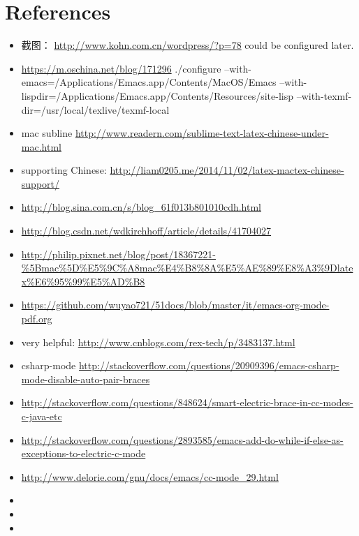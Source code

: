 \documentclass[9pt,b5paper]{article}
\begin{document}
\section{References}
\label{sec-3}
\begin{itemize}
\item 截图： \url{http://www.kohn.com.cn/wordpress/?p=78} could be configured later.
\item \url{https://m.oschina.net/blog/171296} ./configure --with-emacs=/Applications/Emacs.app/Contents/MacOS/Emacs --with-lispdir=/Applications/Emacs.app/Contents/Resources/site-lisp --with-texmf-dir=/usr/local/texlive/texmf-local
\item mac subline \url{http://www.readern.com/sublime-text-latex-chinese-under-mac.html}
\item supporting Chinese: \url{http://liam0205.me/2014/11/02/latex-mactex-chinese-support/}
\item \url{http://blog.sina.com.cn/s/blog_61f013b801010cdh.html}
\item \url{http://blog.csdn.net/wdkirchhoff/article/details/41704027}
\item \url{http://philip.pixnet.net/blog/post/18367221-\%5Bmac\%5D\%E5\%9C\%A8mac\%E4\%B8\%8A\%E5\%AE\%89\%E8\%A3\%9Dlatex\%E6\%95\%99\%E5\%AD\%B8}
\item \url{https://github.com/wuyao721/51docs/blob/master/it/emacs-org-mode-pdf.org}
\item very helpful: \url{http://www.cnblogs.com/rex-tech/p/3483137.html}
\item csharp-mode \url{http://stackoverflow.com/questions/20909396/emacs-csharp-mode-disable-auto-pair-braces}
\item \url{http://stackoverflow.com/questions/848624/smart-electric-brace-in-cc-modes-c-java-etc}
\item \url{http://stackoverflow.com/questions/2893585/emacs-add-do-while-if-else-as-exceptions-to-electric-c-mode}
\item \url{http://www.delorie.com/gnu/docs/emacs/cc-mode_29.html}
\item 
\item 
\item 
\end{itemize}
\end{document}

